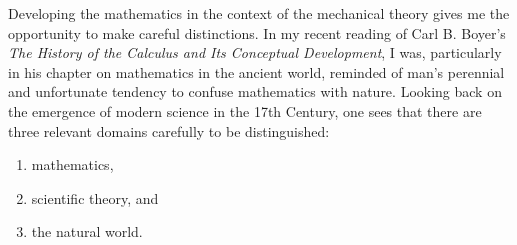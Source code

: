 Developing the mathematics in the context of the mechanical theory gives me the
opportunity to make careful distinctions.  In my recent reading of Carl B.
Boyer's {\it The History of the Calculus and Its Conceptual Development}, I
was, particularly in his chapter on mathematics in the ancient world, reminded
of man's perennial and unfortunate tendency to confuse mathematics with nature.
Looking back on the emergence of modern science in the 17th Century, one sees
that there are three relevant domains carefully to be distinguished:
\begin{enumerate}
   \item mathematics,
   \item scientific theory, and
   \item the natural world.
\end{enumerate}

